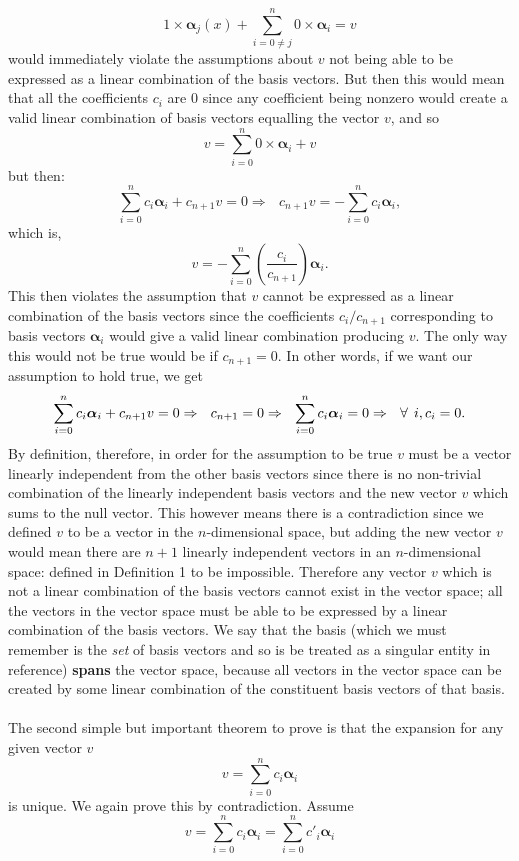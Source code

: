 $$
1\times\bm{\alpha}_{j}(x)+ \sum_{i=0\neq j}^{n}0\times\bm{\alpha}_{i}=v
$$ would immediately violate the assumptions about $v$ not being able to be expressed as a linear combination of the basis vectors.  But then this would mean that all the coefficients $c_{i}$ are $0$ since any coefficient being nonzero would create a valid linear combination of basis vectors equalling the vector $v$, and so
$$
v=\sum_{i=0}^{n}0\times\bm{\alpha}_{i} + v
$$
but then:
$$
\sum_{i=0}^{n}c_{i}\bm{\alpha}_{i} + c_{n+1}v= 0 \Rightarrow\:\:\: c_{n+1}v=-\sum_{i=0}^{n}c_{i}\bm{\alpha}_{i},
$$
which is,
$$
v=-\sum_{i=0}^{n}\left(\frac{c_{i}}{c_{n+1}}\right)\bm{\alpha}_{i}.
$$
This then violates the assumption that $v$ cannot be expressed as a linear combination of the basis vectors since the coefficients $c_{i}/c_{n+1}$ corresponding to basis vectors $\bm{\alpha}_{i}$ would give a valid linear combination producing $v$. The only way this would not be true would be if $c_{n+1}=0$. In other words, if we want our assumption to hold true, we get
$$
\sum_{i=0}^{n}c_{i}\bm{\alpha}_{i} + c_{n+1}v= 0 \Rightarrow\:\:\: c_{n+1}=0\Rightarrow\:\:\:\sum_{i=0}^{n}c_{i}\bm{\alpha}_{i}=0\Rightarrow\:\:\:\forall\:\: i, c_{i}=0.
$$
By definition, therefore, in order for the assumption to be true $v$ must be a vector linearly independent from the other basis vectors since there is no non-trivial combination of the linearly independent basis vectors and the new vector $v$ which sums to the null vector. This however means there is a contradiction since we defined $v$ to be a vector in the $n$-dimensional space, but adding the new vector $v$ would mean there are $n+1$ linearly independent vectors in an $n$-dimensional space: defined in Definition 1 to be impossible. Therefore any vector ${v}$ which is not a linear combination of the basis vectors cannot exist in the vector space; all the vectors in the vector space must be able to be expressed by a linear combination of the basis vectors. We say that the basis (which we must remember is the \textit{set} of basis vectors and so is be treated as a singular entity in reference) \textbf{spans} the vector space, because all vectors in the vector space can be created by some linear combination of the constituent basis vectors of that basis.
\\\\
The second simple but important theorem to prove is that the expansion for any given vector $v$
$$
v = \sum_{i=0}^{n}c_{i}\bm{\alpha}_{i}
$$
is unique. We again prove this by contradiction. Assume
$$
v = \sum_{i=0}^{n}c_{i}\bm{\alpha}_{i}=\sum_{i=0}^{n}c'_{i}\bm{\alpha}_{i}
$$

